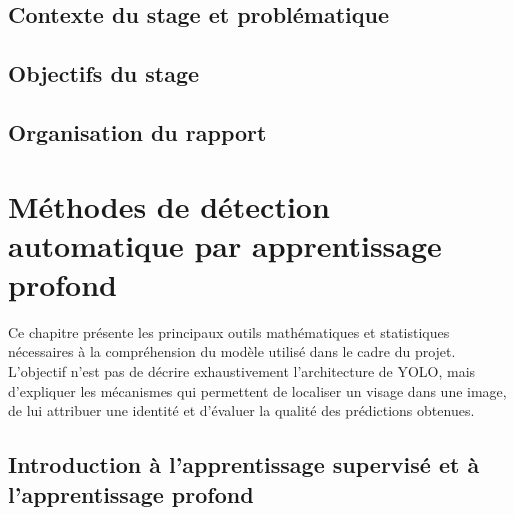 \documentclass[11pt,a4paper]{report}
\begin{document}

\section*{Contexte du stage et problématique}

\section*{Objectifs du stage}

\section*{Organisation du rapport}


\chapter{Méthodes de détection automatique par apprentissage profond}
\label{chap:methode}

Ce chapitre présente les principaux outils mathématiques et statistiques
nécessaires à la compréhension du modèle utilisé dans le cadre du projet.
L'objectif n'est pas de décrire exhaustivement l'architecture de YOLO, mais
d'expliquer les mécanismes qui permettent de localiser un visage dans une image,
de lui attribuer une identité et d'évaluer la qualité des prédictions obtenues.

\section{Introduction à l'apprentissage supervisé et à l'apprentissage profond}
\end{document}
